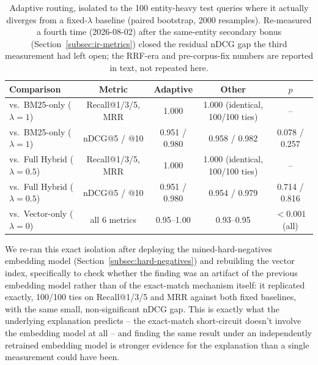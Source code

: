 \documentclass[a4paper,twoside]{article}
\begin{document}
\begin{table}[t]
\caption{Adaptive routing, isolated to the 100 entity-heavy test queries where it actually diverges from a fixed-$\lambda$ baseline (paired bootstrap, 2000 resamples). Re-measured a fourth time (2026-08-02) after the same-entity secondary bonus (Section~\ref{subsec:ir-metrics}) closed the residual nDCG gap the third measurement had left open; the RRF-era and pre-corpus-fix numbers are reported in text, not repeated here.}\label{tab:adaptive-isolated} \centering
\begin{tabular}{|l|c|c|c|c|}
\hline
Comparison & Metric & Adaptive & Other & $p$ \\
\hline
vs.\ BM25-only ($\lambda=1$) & Recall@1/3/5, MRR & 1.000 & 1.000 (identical, 100/100 ties) & -- \\
vs.\ BM25-only ($\lambda=1$) & nDCG@5 / @10 & 0.951 / 0.980 & 0.958 / 0.982 & 0.078 / 0.257 \\
vs.\ Full Hybrid ($\lambda=0.5$) & Recall@1/3/5, MRR & 1.000 & 1.000 (identical, 100/100 ties) & -- \\
vs.\ Full Hybrid ($\lambda=0.5$) & nDCG@5 / @10 & 0.951 / 0.980 & 0.954 / 0.979 & 0.714 / 0.816 \\
vs.\ Vector-only ($\lambda=0$) & all 6 metrics & 0.95--1.00 & 0.93--0.95 & $<0.001$ (all) \\
\hline
\end{tabular}
\end{table}

We re-ran this exact isolation after deploying the mined-hard-negatives embedding model (Section~\ref{subsec:hard-negatives}) and rebuilding the vector index, specifically to check whether the finding was an artifact of the previous embedding model rather than of the exact-match mechanism itself: it replicated exactly, 100/100 ties on Recall@1/3/5 and MRR against both fixed baselines, with the same small, non-significant nDCG gap. This is exactly what the underlying explanation predicts -- the exact-match short-circuit doesn't involve the embedding model at all -- and finding the same result under an independently retrained embedding model is stronger evidence for the explanation than a single measurement could have been.
\end{document}
